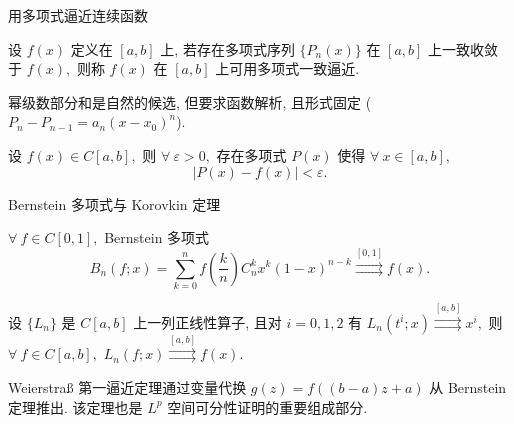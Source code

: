 \graymode
\begin{frame}{用多项式逼近连续函数}

\begin{Def}[多项式一致逼近]
设 $f(x)$ 定义在 $[a, b]$ 上, 若存在多项式序列 $\{P_n(x)\}$ 在 $[a, b]$ 上一致收敛于 $f(x),$ 则称 $f(x)$ 在 $[a, b]$ 上可用多项式一致逼近.
\end{Def}

\pause

幂级数部分和是自然的候选, 但要求函数{\color{red}解析}, 且形式固定 ($P_n - P_{n-1} = a_n (x-x_0)^n$).

\pause
\vspace{0.5em}

\begin{thm}
设 $f(x) \in C[a, b],$ 则 $\forall~\varepsilon > 0,$ 存在多项式 $P(x)$ 使得 $\forall~x \in [a, b],$
\[|P(x) - f(x)| < \varepsilon.\]
\end{thm}

\end{frame}


\begin{frame}{Bernstein 多项式与 Korovkin 定理}

\begin{thm}[Bernstein 定理]
$\forall~f \in C[0, 1],$ Bernstein 多项式
\[B_n(f; x) = \sum_{k=0}^n f\left( \frac{k}{n} \right) C_n^k x^k (1-x)^{n-k} \stackrel{[0, 1]}{\rightrightarrows} f(x).\]
\end{thm}

\pause

\begin{thm}[Korovkin 定理]
设 $\{L_n\}$ 是 $C[a,b]$ 上一列{\color{red}正线性算子}, 且对 $i = 0, 1, 2$ 有 $L_n(t^i; x) \stackrel{[a,b]}{\rightrightarrows} x^i,$
则 $\forall~f \in C[a,b],$ $L_n(f; x) \stackrel{[a,b]}{\rightrightarrows} f(x).$
\end{thm}

\pause

Weierstraß 第一逼近定理通过变量代换 $g(z) = f((b-a)z + a)$ 从 Bernstein 定理推出.
该定理也是 $L^p$ 空间可分性证明的重要组成部分.

\end{frame}
\normalmode


